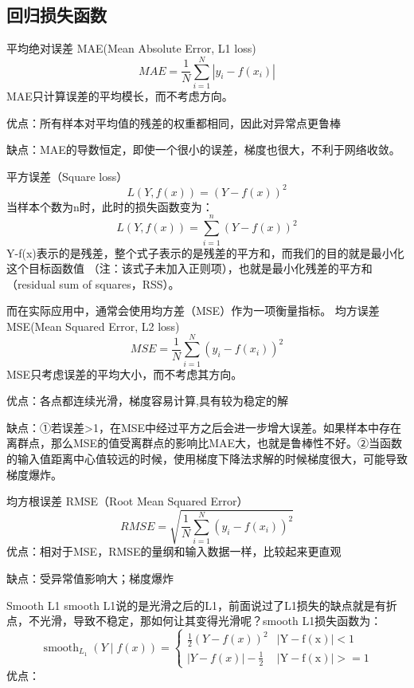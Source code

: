 \subsection{回归损失函数}
\begin{outline}
	\1 平均绝对误差 MAE(Mean Absolute Error, L1 loss)
	\begin{equation}\label{loss:1}
		M A E=\frac{1}{N} \sum_{i=1}^{N}\left|y_{i}-f\left(x_{i}\right)\right|
	\end{equation}
	\2 MAE只计算误差的平均模长，而不考虑方向。

	\2 优点：所有样本对平均值的残差的权重都相同，因此对异常点更鲁棒

	\2 缺点：MAE的导数恒定，即使一个很小的误差，梯度也很大，不利于网络收敛。


	\1 平方误差（Square loss）
	\begin{equation}
		L(Y, f(x))=(Y-f(x))^{2}
	\end{equation}
	当样本个数为n时，此时的损失函数变为：
	\begin{equation}
		L(Y, f(x))=\sum_{i=1}^{n}(Y-f(x))^{2}
	\end{equation}
	Y-f(x)表示的是残差，整个式子表示的是残差的平方和，而我们的目的就是最小化这个目标函数值
	（注：该式子未加入正则项），也就是最小化残差的平方和（residual sum of squares，RSS）。
	
	而在实际应用中，通常会使用均方差（MSE）作为一项衡量指标。
	\1 均方误差 MSE(Mean Squared Error, L2 loss)
	\begin{equation}\label{loss:2}
		M S E=\frac{1}{N} \sum_{i=1}^{N}\left(y_{i}-f\left(x_{i}\right)\right)^{2}
		\end{equation}
	\2 MSE只考虑误差的平均大小，而不考虑其方向。

	\2 优点：各点都连续光滑，梯度容易计算,具有较为稳定的解

	\2 缺点：①若误差>1，在MSE中经过平方之后会进一步增大误差。如果样本中存在离群点，那么MSE的值受离群点的影响比MAE大，也就是鲁棒性不好。②当函数的输入值距离中心值较远的时候，使用梯度下降法求解的时候梯度很大，可能导致梯度爆炸。

	\1 均方根误差 RMSE（Root Mean Squared Error）
	\begin{equation}\label{loss:3}
		R M S E=\sqrt{\frac{1}{N} \sum_{i=1}^{N}\left(y_{i}-f\left(x_{i}\right)\right)^{2}}
		\end{equation}
		\2 优点：相对于MSE，RMSE的量纲和输入数据一样，比较起来更直观

		\2 缺点：受异常值影响大；梯度爆炸

	\1 Smooth L1
	\2 smooth L1说的是光滑之后的L1，前面说过了L1损失的缺点就是有折点，不光滑，导致不稳定，那如何让其变得光滑呢？smooth L1损失函数为：
	\begin{equation}\label{loss:4}
		\operatorname{smooth}_{L_{1}}(Y \mid f(x))= \begin{cases}\frac{1}{2}(Y-f(x))^{2} & |\mathrm{Y}-\mathrm{f}(\mathrm{x})|<1 \\ |Y-f(x)|-\frac{1}{2} & |\mathrm{Y}-\mathrm{f}(\mathrm{x})|>=1\end{cases}
		\end{equation}
		\2 优点：


\end{outline}
